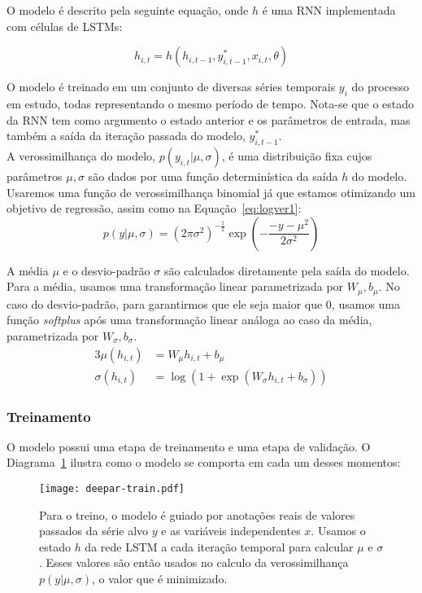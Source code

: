 O modelo é descrito pela seguinte equação, onde $h$ é uma RNN implementada com células de LSTMs:

\[
h_{i,t} = h(h_{i,t-1},y^*_{i,t-1},x_{i,t}, \theta)
\]

O modelo é treinado em um conjunto de diversas séries temporais $y_i$ do
processo em estudo, todas representando o mesmo período de tempo. Nota-se que o estado da RNN tem como argumento o estado anterior e os parâmetros de entrada, mas também a saída da iteração passada do modelo, $y^*_{i,t-1}$. \\

A verossimilhança do modelo, $p(y_{i,t} | \mu,\sigma)$, é uma distribuição fixa
cujos parâmetros $\mu, \sigma$ são dados por uma função determinística da saída $h$ do modelo. Usaremos uma função de verossimilhança binomial já que estamos otimizando um objetivo de regressão, assim como na Equação~\ref{eq:logver1}:
\[
  p(y | \mu,\sigma) = {(2\pi\sigma^2)}^{-\frac{1}{2}} \exp(-  \frac{-y - \mu^2}{2\sigma^2})  
\]

A média $\mu$ e o desvio-padrão $\sigma$ são calculados diretamente pela saída do modelo. Para a média, usamos uma transformação linear parametrizada por $W_{\mu},b_{\mu}$. No caso do desvio-padrão, para garantirmos que ele seja maior que 0, usamos uma função \textit{softplus} após uma transformação linear análoga ao caso da média, parametrizada por  $W_{\sigma},b_{\sigma}$.\\

\begin{alignat}{3}
  \mu(h_{i,t}) &= W_{\mu}h_{i,t} + b_{\mu} \\ 
  \sigma(h_{i,t}) &= \log(1 + \exp(W_{\sigma}h_{i,t}+ b_{\sigma}))
\end{alignat}


\subsubsection{Treinamento}


O modelo possui uma etapa de treinamento e uma etapa de validação. O Diagrama~\ref{fig:deepartrain} ilustra como o modelo se comporta em cada um desses momentos: \\


\begin{figure}[H]
  \centering
  \texttt{[image: deepar-train.pdf]}
  \caption{Para o treino, o modelo é guiado por anotações reais de valores
    passados da série alvo $y$ e as variáveis independentes $x$. Usamos o estado
  $h$ da rede LSTM a cada iteração temporal para calcular $\mu$  e $\sigma$.
  Esses valores são então usados no calculo da verossimilhança $p(y |
  \mu,\sigma)$, o valor que é minimizado.}
  \label{fig:deepartrain}
\end{figure}

